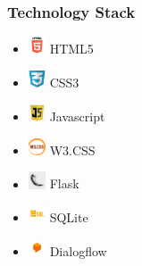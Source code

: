 \documentclass[14pt]{beamer}
\begin{document}
\begin{frame}
    \frametitle{Technology Stack}
    \noindent
    \begin{itemize}
        \item [] \includegraphics[width=0.2in, height=0.2in]{./logos/html.png} HTML5 \\
            \pause
        \item [] \includegraphics[width=0.2in, height=0.2in]{./logos/css.png} CSS3 \\
            \pause
        \item [] \includegraphics[width=0.2in, height=0.2in]{./logos/java.png} Javascript \\
            \pause
        \item [] \includegraphics[width=0.2in, height=0.2in]{./logos/w3.png} W3.CSS \\
            \pause
        \item [] \includegraphics[width=0.2in, height=0.2in]{./logos/flask.jpg} Flask \\
            \pause
        \item [] \includegraphics[width=0.2in, height=0.2in]{./logos/sql.jpg} SQLite \\
            \pause
        \item [] \includegraphics[width=0.2in, height=0.2in]{./logos/dialogflow.jpg} Dialogflow \\
    \end{itemize}
\noindent
\end{frame}
\end{document}
